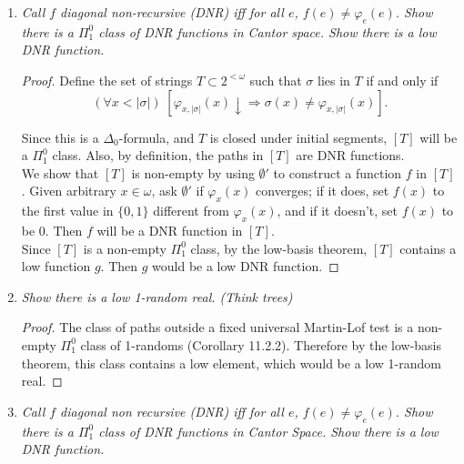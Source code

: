 \documentclass{article}
\begin{document}
\begin{enumerate}
  \item \it Call $f$ diagonal non-recursive (DNR) iff for all $e$,
    $f(e)\neq\varphi_e(e)$. Show there is a $\Pi_1^0$ class of DNR
    functions in Cantor space. Show there is a low DNR function.

    \begin{proof}
      Define the set of strings $T\subset2^{<\omega}$ such that $\sigma$
      lies in $T$ if and only if
      \[(\forall x<|\sigma|)\; [\varphi_{x,|\sigma|}(x)\downarrow
      \Rightarrow \sigma(x) \neq\varphi_{x,|\sigma|}(x)].\]

      Since this is a $\Delta_0$-formula, and $T$ is closed under initial
      segments, $[T]$ will be a $\Pi_1^0$ class. Also, by definition, the
      paths in $[T]$ are DNR functions. \\

      We show that $[T]$ is non-empty by using $\emptyset'$ to construct a
      function $f$ in $[T]$. Given arbitrary $x\in\omega$, ask $\emptyset'$
      if $\varphi_x(x)$ converges; if it does, set $f(x)$ to the first
      value in $\{0,1\}$ different from $\varphi_x(x)$, and if it
      doesn't, set $f(x)$ to be 0. Then $f$ will be a DNR function in
      $[T]$. \\

      Since $[T]$ is a non-empty $\Pi_1^0$ class, by the low-basis theorem,
      $[T]$ contains a low function $g$. Then $g$ would be a low DNR
      function.
    \end{proof}

  \item \it Show there is a low 1-random real. (Think trees)
    \begin{proof}
      The class of paths outside a fixed universal Martin-Lof test is a
      non-empty $\Pi_1^0$ class of 1-randoms (Corollary 11.2.2). Therefore
      by the low-basis theorem, this class contains a low element, which
      would be a low 1-random real.
    \end{proof}

  \item \it Call $f$ diagonal non recursive (DNR) iff for all $e$,
    $f(e)\neq\varphi_e(e)$. Show there is a $\Pi^0_1$ class of DNR
    functions in Cantor Space. Show there is a low DNR function.


\end{enumerate}
\end{document}

